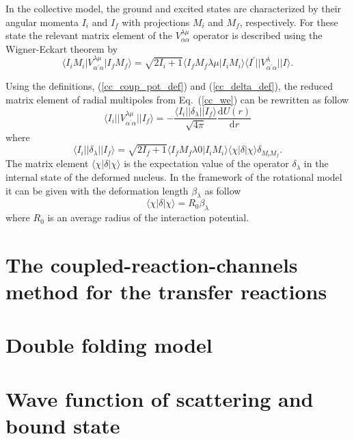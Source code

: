 \documentclass[
11pt, %
english, %
onehalfspacing, %
headsepline, %
]{MastersDoctoralThesis} %
\begin{document}
In the collective model, the ground and excited states are characterized by their angular momenta $I_i$ and $I_{f}$ with projections $M_i$ and $M_{f}$, respectively. For these state the relevant matrix element of the $V_{\alpha \alpha}^{\lambda \mu}$ operator is described using the Wigner-Eckart theorem by
\begin{equation}
\langle I_{i} M_{i} \vert V^{\lambda \mu}_{\alpha^{\prime} \alpha}  \vert I_f M_f \rangle 
= \sqrt{2I_i + 1} 
\langle I_f M_f \lambda \mu \vert I_i M_i\rangle
 \langle I^{\prime} \vert \vert V^{\lambda}_{\alpha^{\prime} \alpha} \vert \vert	 I \rangle.
 \label{cc_we}
\end{equation} 

Using the definitions, (\ref{cc_coup_pot_def}) and (\ref{cc_delta_def}), the reduced matrix element of radial multipoles from Eq.~(\ref{cc_we}) can be rewritten as follow 
 \begin{equation}
 \langle I_{i} \vert \vert V^{\lambda \mu}_{\alpha^{\prime} \alpha}  \vert \vert I_f \rangle = -\frac{\langle I_{i} \vert \vert \delta_\lambda \vert \vert I_f \rangle}{\sqrt{4 \pi}} 
 \frac{\text{d}U(r)}{\text{d}r}
 \end{equation}
 where 
\begin{equation}
\langle I_{i} \vert \vert \delta_\lambda \vert \vert I_f \rangle = \sqrt{2 I_f+1} 
\langle I_f M_f \lambda 0 \vert I_i M_i \rangle 
\langle \chi \vert \delta \vert \chi \rangle \delta_{M_i M_f}.
\end{equation}
The matrix element $\langle \chi \vert \delta \vert \chi \rangle$ is the expectation value of the operator $\delta_\lambda$ in the internal state of the  deformed nucleus. In the framework of the rotational model it can be given with the deformation length $\beta_\lambda$ as follow
\begin{equation}
\langle \chi \vert \delta \vert \chi \rangle = R_0 \beta_\lambda
\end{equation}
where $R_0$ is an average radius of the interaction potential.

\section{The coupled-reaction-channels method for the transfer reactions}
\section{Double folding model}
\section{Wave function of scattering and bound state}
\end{document}
